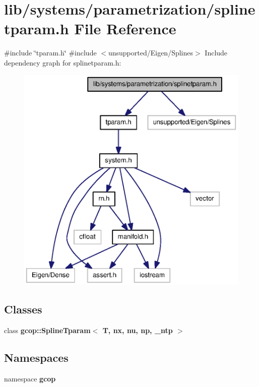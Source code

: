\section{lib/systems/parametrization/splinetparam.h \-File \-Reference}
\label{splinetparam_8h}
{\ttfamily \#include \char`\"{}tparam.\-h\char`\"{}}\*
{\ttfamily \#include $<$unsupported/\-Eigen/\-Splines$>$}\*
\-Include dependency graph for splinetparam.\-h\-:
\nopagebreak
\begin{figure}[H]
\begin{center}
\leavevmode
\includegraphics[width=350pt]{splinetparam_8h__incl}
\end{center}
\end{figure}
\subsection*{\-Classes}
\begin{DoxyCompactItemize}
\item 
class {\bf gcop\-::\-Spline\-Tparam$<$ T, nx, nu, np, \-\_\-ntp $>$}
\end{DoxyCompactItemize}
\subsection*{\-Namespaces}
\begin{DoxyCompactItemize}
\item 
namespace {\bf gcop}
\end{DoxyCompactItemize}
